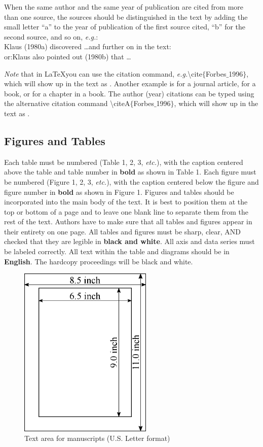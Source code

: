 \documentclass[10pt]{extarticle}
\begin{document}
When the same author and the same year of publication are cited from more than one source, the sources should be distinguished in the text by adding the small letter ``a'' to the year of publication of the first source cited, ``b'' for the second source, and so on, \textit{e.g.}:\\
\tabto{0.3in}Klaus (1980a) discovered \ldots and further on in the text:\\
or:\tabto{0.3in}Klaus also pointed out (1980b) that \ldots

\emph{Note} that in \LaTeX you can use the citation command, \textit{e.g.}\textbackslash cite$\{$Forbes$\_$1996$\}$, which will show up in the text as \cite{Forbes_1996}. Another example is \cite{Herbe_1997} for a journal article, \cite{Janna_1986} for a book, or \cite{Duminil_1995} for a chapter in a book. The author (year) citations can be typed using the alternative citation command \textbackslash citeA$\{$Forbes$\_$1996$\}$, which will show up in the text as . 

\subsection{Figures and Tables}
Each table must be numbered (Table 1, 2, 3, \textit{etc.}), with the caption centered above the table and table number in \textbf{bold} as shown in Table 1.  Each figure must be numbered (Figure 1, 2, 3, \textit{etc.}), with the caption centered below the figure and figure number in \textbf{bold} as shown in Figure 1.  Figures and tables should be incorporated into the main body of the text. It is best to position them at the top or bottom of a page and to leave one blank line to separate them from the rest of the text.  Authors have to make sure that all tables and figures appear in their entirety on one page.  All tables and figures must be sharp, clear, AND checked that they are legible in \textbf{black and white}.  All axis and data series must be labeled correctly. All text within the table and diagrams should be in \textbf{English}. The hardcopy proceedings will be black and white.

\begin{figure}
\centering
\includegraphics[width = 2.5in]{manuscriptpagesetup}
\caption{Text area for manuscripts (U.S. Letter format)}
\end{figure}
\end{document}
